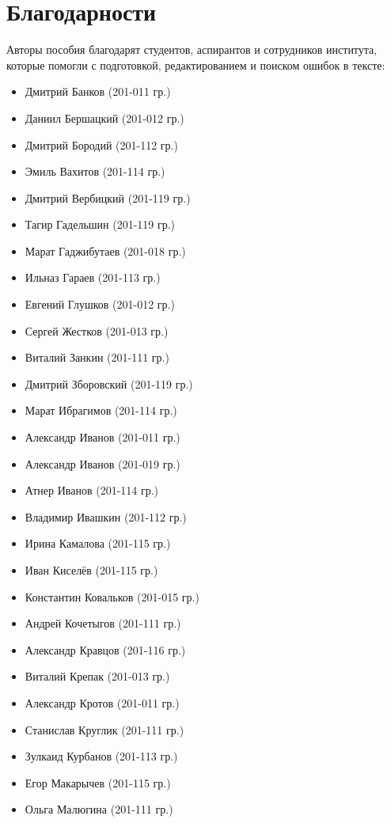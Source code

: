 \section*{Благодарности}
Авторы пособия благодарят студентов, аспирантов и сотрудников института, которые помогли с подготовкой, редактированием и поиском ошибок в тексте:

\begin{itemize}
	\item Дмитрий Банков (201-011 гр.)
	\item Даниил Бершацкий (201-012 гр.)
	\item Дмитрий Бородий (201-112 гр.)
	\item Эмиль Вахитов (201-114 гр.)
	\item Дмитрий Вербицкий (201-119 гр.)
	\item Тагир Гадельшин (201-119 гр.)
	\item Марат Гаджибутаев (201-018 гр.)
	\item Ильназ Гараев (201-113 гр.)
	\item Евгений Глушков (201-012 гр.)
	\item Сергей Жестков (201-013 гр.)
        \item Виталий Занкин (201-111 гр.)
	\item Дмитрий Зборовский (201-119 гр.)
	\item Марат Ибрагимов (201-114 гр.)
	\item Александр Иванов (201-011 гр.)
	\item Александр Иванов (201-019 гр.)
	\item Атнер Иванов (201-114 гр.)
	\item Владимир Ивашкин (201-112 гр.)
	\item Ирина Камалова (201-115 гр.)
	\item Иван Киселёв (201-115 гр.)
	\item Константин Ковальков (201-015 гр.)
	\item Андрей Кочетыгов (201-111 гр.)
	\item Александр Кравцов (201-116 гр.)
	\item Виталий Крепак (201-013 гр.)
	\item Александр Кротов (201-011 гр.)
	\item Станислав Круглик (201-111 гр.)
	\item Зулкаид Курбанов (201-113 гр.)
	\item Егор Макарычев (201-115 гр.)
	\item Ольга Малюгина (201-111 гр.)

\end{itemize}
